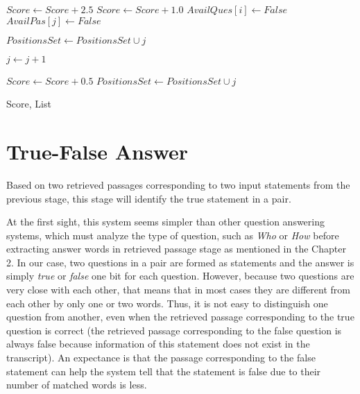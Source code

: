 \begin{algorithm}
\begin{algorithmic} [1]
		\STATE $Score \gets Score + 2.5$ 
		\ELSE 
		\STATE $Score \gets Score + 1.0$ 
		\ENDIF
		\STATE $AvailQues[i] \gets False$  
		\STATE $AvailPas[j] \gets False $ 
				
		\STATE $PositionsSet \gets PositionsSet \cup j$ 
	\ENDIF

		
	\STATE $j \gets j+1$
	\ENDWHILE
\ENDFOR

\STATE{}
			\STATE $Score \gets Score + 0.5$
			\STATE $PositionsSet \gets PositionsSet \cup j$ 
		\ENDIF
	\ENDFOR
\ENDFOR

\RETURN Score, List
\end{algorithmic}
\end{algorithm}

\newpage
\normalsize




\newpage

\section{True-False Answer}

Based on two retrieved passages corresponding to two input statements from the previous stage, this stage will identify the true statement in a pair. 

At the first sight, this system seems simpler than other question answering systems, which must analyze the type of question, such as \textit{Who} or \textit{How} before extracting answer words in retrieved passage stage as mentioned in the Chapter 2. In our case, two questions in a pair are formed as statements and the answer is simply \textit{true} or \textit{false} one bit for each question. However, because two questions are very close with each other, that means that in most cases they are different from each other by only one or two words. Thus, it is not easy to distinguish one question from another, even when the retrieved passage corresponding to the true question is correct (the retrieved passage corresponding to the false question is always false because information of this statement does not exist in the transcript). An expectance is that the passage corresponding to the false statement can help the system tell that the statement is false due to their number of matched words is less.

